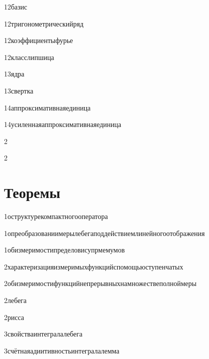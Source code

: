 {12}{базис}

{12}{тригонометрическийряд}

{12}{коэффициентыфурье}

{12}{класслипшица}

{13}{ядра}

{13}{свертка}

{14}{аппроксимативнаяединица}

{14}{усиленнаяаппроксимативнаяединица}

{2}{}

{2}{}


\section{Теоремы}

{1}{оструктурекомпактногооператора}

{1}{опреобразованиимерылебегаподдействиемлинейногоотображения}

{1}{обизмеримостипределовисупрмемумов}

{2}{характеризацияизмеримыхфункцийспомощьюступенчатых}

{2}{обизмеримостифункцийнепрерывныхнамножествеполноймеры}

{2}{лебега}

{2}{рисса}

{3}{свойстваинтегралалебега}

{3}{счётнаяадиитивностьинтегралалемма}

